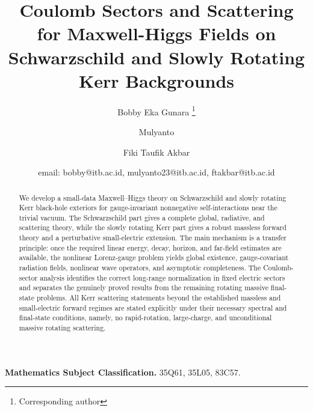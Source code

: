 \documentclass[11pt]{article}
\numberwithin{equation}{section}
\theoremstyle{plain}
\theoremstyle{definition}
\theoremstyle{remark}
\begin{document}
\pagestyle{fancy}
\fancyhf{}
\fancyhead[R]{\thepage}
\renewcommand{\headrulewidth}{0pt}

\title{\Large\textbf{Coulomb Sectors and Scattering for Maxwell-Higgs Fields on Schwarzschild and Slowly Rotating Kerr Backgrounds}}



\author{Bobby Eka Gunara \thanks{Corresponding author}}
\author{Mulyanto}
\author{Fiki Taufik Akbar}



\date{\small email: bobby@itb.ac.id, mulyanto23@itb.ac.id, ftakbar@itb.ac.id}

\maketitle



\begin{abstract}
We develop a small-data Maxwell--Higgs theory on Schwarzschild and slowly rotating Kerr black-hole exteriors for gauge-invariant nonnegative self-interactions near the trivial vacuum. The Schwarzschild part gives a complete global, radiative, and scattering theory, while the slowly rotating Kerr part gives a robust massless forward theory and a perturbative small-electric extension. The main mechanism is a transfer principle: once the required linear energy, decay, horizon, and far-field estimates are available, the nonlinear Lorenz-gauge problem yields global existence, gauge-covariant radiation fields, nonlinear wave operators, and asymptotic completeness. The Coulomb-sector analysis identifies the correct long-range normalization in fixed electric sectors and separates the genuinely proved results from the remaining rotating massive final-state problems. All Kerr scattering statements beyond the established massless and small-electric forward regimes are stated explicitly under their necessary spectral and final-state conditions, namely, no rapid-rotation, large-charge, and unconditional massive rotating scattering.
\end{abstract}

\medskip

\noindent\textbf{Mathematics Subject Classification.} 35Q61, 35L05, 83C57.
\medskip
\end{document}
